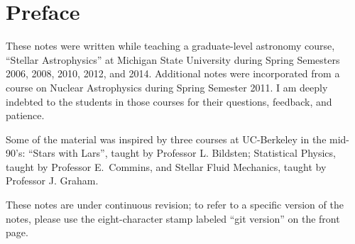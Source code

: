 \section*{Preface}
These notes were written while teaching a graduate-level astronomy course, ``Stellar Astrophysics'' at Michigan State University during Spring Semesters 2006, 2008, 2010, 2012, and 2014.  Additional notes were incorporated from a course on Nuclear Astrophysics during Spring Semester 2011. I am deeply indebted to the students in those courses for their questions, feedback, and patience.

Some of the material was inspired by three courses at UC-Berkeley in the mid-90's: ``Stars with Lars'', taught by Professor L. Bildsten; Statistical Physics, taught by Professor E.~Commins, and Stellar Fluid Mechanics, taught by Professor J. Graham.

These notes are under continuous revision; to refer to a specific version of the notes, please use the eight-character stamp labeled ``git version'' on the front page.
